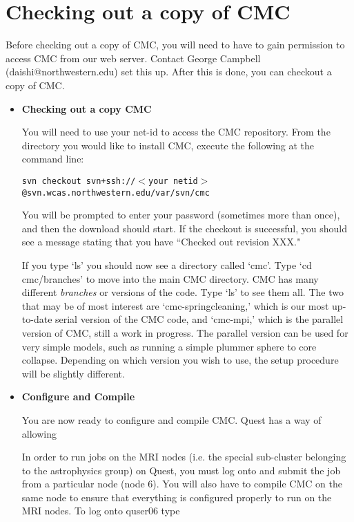 \documentclass[11pt]{article}
\begin{document}


\section{Checking out a copy of CMC}
Before checking out a copy of CMC, you will need to have to gain permission to access CMC from our web server. Contact George Campbell (daishi@northwestern.edu) set this up. After this is done, you can checkout a copy of CMC.

\begin{itemize}
\item \textbf{Checking out a copy CMC}

You will need to use your net-id to access the CMC repository. From the directory you would like to install CMC, execute the following at the command line:

{\addtolength{\leftskip}{10mm} 
\texttt{svn checkout svn+ssh://$<$your netid$>$@svn.wcas.northwestern.edu/var/svn/cmc}

}

You will be prompted to enter your password (sometimes more than once), and then the download should start. If the checkout is successful, you should see a message stating that you have ``Checked out revision XXX." 

If you type `ls' you should now see a directory called `cmc'. Type `cd cmc/branches' to move into the main CMC directory. CMC has many different \emph{branches} or versions of the code. Type `ls' to see them all. The two that may be of most interest are `cmc-springcleaning,' which is our most up-to-date serial version of the CMC code, and `cmc-mpi,' which is the parallel version of CMC, still a work in progress. The parallel version can be used for very simple models, such as running a simple plummer sphere to core collapse. Depending on which version you wish to use, the setup procedure will be slightly different.


\item \textbf{Configure and Compile}

You are now ready to configure and compile CMC. Quest has a way of allowing


In order to run jobs on the MRI nodes (i.e. the special sub-cluster belonging to the astrophysics group) on Quest, you must log onto and submit the job from a particular node (node 6). You will also have to compile CMC on the same node to ensure that everything is configured properly to run on the MRI nodes. To log onto quser06 type


\end{itemize}
\end{document}
